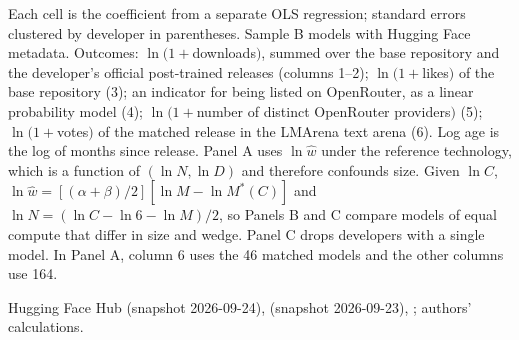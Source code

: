 \begin{table}[tp]
\medskip
\begin{tablenotes}
Each cell is the coefficient from a separate OLS regression; standard errors clustered by developer in parentheses.
Sample B models with Hugging Face metadata. Outcomes: $\ln(1+{}$downloads$)$, summed over the base repository and the
developer's official post-trained releases (columns 1--2); $\ln(1+{}$likes$)$ of the base repository (3); an indicator
for being listed on OpenRouter, as a linear probability model (4); $\ln(1+{}$number of distinct OpenRouter
providers$)$ (5); $\ln(1+{}$votes$)$ of the matched release in the LMArena text arena (6). Log age is the log of
months since release. Panel A uses $\ln\hat w$ under the reference technology, which is a function of $(\ln N,\ln D)$
and therefore confounds size. Given $\ln C$, $\ln\hat w=[(\alpha+\beta)/2][\ln M-\ln M^*(C)]$ and
$\ln N=(\ln C-\ln6-\ln M)/2$, so Panels B and C compare models of equal compute that differ in size and wedge.
Panel C drops developers with a single model. In Panel A, column 6 uses the 46 matched models and the other columns
use 164.
\end{tablenotes}
\begin{tablenotes}[Source]
Hugging Face Hub (snapshot 2026-09-24), \citet{openrouter2026models} (snapshot 2026-09-23),
\citet{lmarena2026leaderboard}; authors' calculations.
\end{tablenotes}
\end{table}
